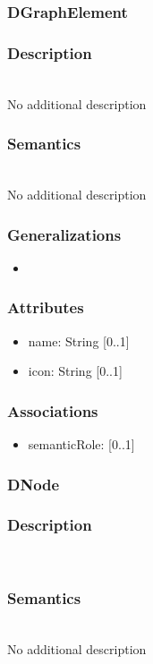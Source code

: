 \documentclass{article}
\begin{document}
\subsubsection{DGraphElement}\label{DGraphElement} 
\subsubsection*{Description} ~\\ No additional description
\subsubsection*{Semantics} ~\\ No additional description
\subsubsection*{Generalizations}
\begin{itemize}
\item {}
\end{itemize}
\subsubsection*{Attributes}
\begin{itemize}
\item name: String [0..1] 
\item icon: String [0..1] 
\end{itemize}
\subsubsection*{Associations}
\begin{itemize}
\item semanticRole:  [0..1] 
\end{itemize}
\subsubsection{DNode}\label{DNode} 
\subsubsection*{Description} ~\\

\subsubsection*{Semantics} ~\\ No additional description
\end{document}
